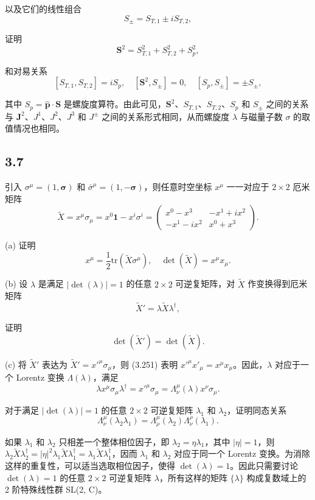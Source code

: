 以及它们的线性组合
$$ S_\pm = S_{T,1} \pm i S_{T,2}, \tag{3.245} $$

证明
$$ \mathbf{S}^2 = S_{T,1}^2 + S_{T,2}^2 + S_p^2, \tag{3.246} $$

和对易关系
$$ [S_{T,1}, S_{T,2}] = i S_p, \quad [\mathbf{S}^2, S_\pm] = 0, \quad [S_p, S_\pm] = \pm S_\pm, \tag{3.247} $$

其中 $ S_p = \hat{\mathbf{p}} \cdot \mathbf{S} $ 是螺旋度算符。由此可见，$ \mathbf{S}^2 $、$ S_{T,1} $、$ S_{T,2} $、$ S_p $ 和 $ S_\pm $ 之间的关系与 $ \mathbf{J}^2 $、$ J^1 $、$ J^2 $、$ J^3 $ 和 $ J^\pm $ 之间的关系形式相同，从而螺旋度 $ \lambda $ 与磁量子数 $ \sigma $ 的取值情况也相同。

\newpage
\subsection{3.7}
引入 $ \sigma^\mu = (1, \boldsymbol{\sigma}) $ 和 $ \bar{\sigma}^\mu = (1, -\boldsymbol{\sigma}) $，则任意时空坐标 $ x^\mu $ 一一对应于 $ 2 \times 2 $ 厄米矩阵
$$ \tilde{X} = x^\mu \sigma_\mu = x^0 \mathbf{1} - x^i \sigma^i = \begin{pmatrix} x^0 - x^3 & -x^1 + i x^2 \\ -x^1 - i x^2 & x^0 + x^3 \end{pmatrix}. \tag{3.248} $$

(a) 证明
$$ x^\mu = \frac{1}{2} \mathrm{tr}(\tilde{X} \sigma^\mu), \quad \det(\tilde{X}) = x^\mu x_\mu. \tag{3.249} $$

(b) 设 $ \lambda $ 是满足 $ |\det(\lambda)| = 1 $ 的任意 $ 2 \times 2 $ 可逆复矩阵，对 $ \tilde{X} $ 作变换得到厄米矩阵
$$ \tilde{X}' = \lambda \tilde{X} \lambda^\dagger, \tag{3.250} $$

证明
$$ \det(\tilde{X}') = \det(\tilde{X}). \tag{3.251} $$

(c) 将 $ \tilde{X}' $ 表达为 $ \tilde{X}' = x'^\mu \sigma_\mu $，则 (3.251) 表明 $ x'^\mu x'_\mu = x^\mu x_\mu $。因此，$ \lambda $ 对应于一个 Lorentz 变换 $ \Lambda(\lambda) $，满足
$$ \lambda x^\mu \sigma_\mu \lambda^\dagger = x'^\mu \sigma_\mu = \Lambda^\mu_\nu (\lambda) x^\nu \sigma_\mu. \tag{3.252} $$

对于满足 $ |\det(\lambda)| = 1 $ 的任意 $ 2 \times 2 $ 可逆复矩阵 $ \lambda_1 $ 和 $ \lambda_2 $，证明同态关系
$$ \Lambda^\mu_\nu (\lambda_2 \lambda_1) = \Lambda^\mu_\rho (\lambda_2) \Lambda^\rho_\nu (\lambda_1). \tag{3.253} $$

如果 $ \lambda_1 $ 和 $ \lambda_2 $ 只相差一个整体相位因子，即 $ \lambda_2 = \eta \lambda_1 $，其中 $ |\eta| = 1 $，则 $ \lambda_2 \tilde{X} \lambda_2^\dagger = |\eta|^2 \lambda_1 \tilde{X} \lambda_1^\dagger = \lambda_1 \tilde{X} \lambda_1^\dagger $，因而 $ \lambda_1 $ 和 $ \lambda_2 $ 对应于同一个 Lorentz 变换。为消除这样的重复性，可以适当选取相位因子，使得 $ \det(\lambda) = 1 $。因此只需要讨论 $ \det(\lambda) = 1 $ 的任意 $ 2 \times 2 $ 可逆复矩阵 $ \lambda $，所有这样的矩阵 $ \{\lambda\} $ 构成复数域上的 2 阶特殊线性群 SL(2, C)。

